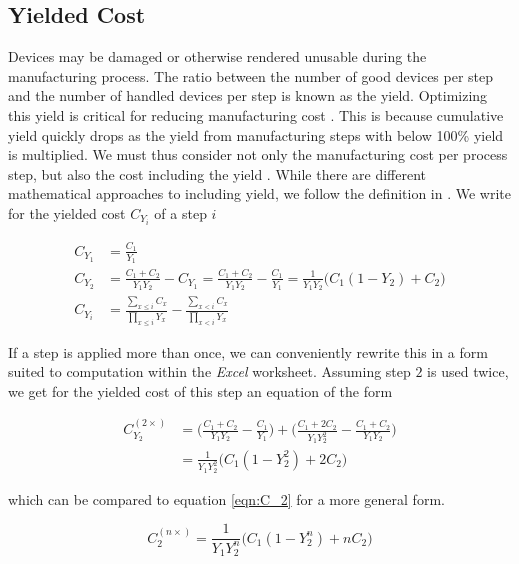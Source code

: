 \documentclass{article}
\begin{document}
\subsection{Yielded Cost}

Devices may be damaged or otherwise rendered unusable during the manufacturing process. The ratio between the number of good devices per step and the number of handled devices per step is known as the yield. Optimizing this yield is critical for reducing manufacturing cost \cite{Kumar2006}. This is because cumulative yield quickly drops as the yield from manufacturing steps with below 100\% yield is multiplied. We must thus consider not only the manufacturing cost per process step, but also the cost including the yield \cite{becker2001use}\cite{becker2001using}. While there are different mathematical approaches to including yield, we follow the definition in  \cite{becker2001use}. We write for the yielded cost $C_{Y_i}$ of a step $i$

\begin{equation}
\begin{split}
\label{eqn:C_2}
    C_{Y_1} &= \frac{C_1}{Y_1} \\
    C_{Y_2} &= \frac{C_1 + C_2}{Y_1 Y_2} - C_{Y_1} = \frac{C_1 + C_2}{Y_1 Y_2} - \frac{C_1}{Y_1} = \frac{1}{Y_1 Y_2} \bigg ( C_1 (1-Y_2) +C_2 \bigg)\\
    C_{Y_i} &= \frac{ \sum_{x \leq i} C_x }{ \prod_{x \leq i} Y_x } - \frac{ \sum_{x<i} C_x }{ \prod_{x<i} Y_x }
\end{split}
\end{equation}

If a step is applied more than once, we can conveniently rewrite this in a form suited to computation within the \textit{Excel} worksheet. Assuming step $2$ is used twice, we get for the yielded cost of this step an equation of the form

\begin{align}
\label{eqn:C_2^2}
    C_{Y_2}^{(2 \times)} &= \bigg( \frac{C_1 + C_2}{Y_1 Y_2} - \frac{C_1}{Y_1} \bigg) + \bigg( \frac{C_1 + 2 C_2}{Y_1 Y_2^2} - \frac{C_1 + C_2}{Y_1 Y_2}     \bigg) \\
    &= \frac{1}{Y_1 Y_2^2} \bigg( C_1 (1-Y_2^2) +2C_2 \bigg)
\end{align}

which can be compared to equation \ref{eqn:C_2} for a more general form.

\begin{equation}
    C_2^{(n \times)} = \frac{1}{Y_1 Y_2^n} \bigg( C_1 (1-Y_2^n)+nC_2\bigg)
\end{equation}
\end{document}
